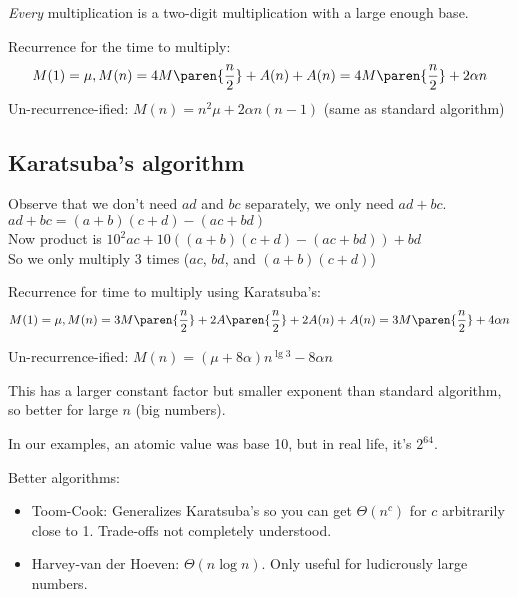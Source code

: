 \emph{Every} multiplication is a two-digit multiplication with a large enough base.

Recurrence for the time to multiply:
\[M(1) = \mu, M(n) = 4M\paren{\frac n 2} + A(n) + A(n) = 4M\paren{\frac n 2} + 2\alpha n\]
Un-recurrence-ified: $M(n) = n^2\mu + 2\alpha n(n-1)$ (same as standard algorithm)

\subsection{Karatsuba's algorithm}

Observe that we don't need $ad$ and $bc$ separately, we only need $ad + bc$. $ad + bc = (a + b)(c + d) - (ac + bd)$\\
Now product is $10^2ac + 10((a + b)(c + d) - (ac + bd)) + bd$\\
So we only multiply 3 times ($ac$, $bd$, and $(a + b)(c + d)$)

Recurrence for time to multiply using Karatsuba's:
\[M(1) = \mu, M(n) = 3M\paren{\frac n 2} + 2A\paren{\frac n 2} + 2A(n) + A(n) = 3M\paren{\frac n 2} + 4\alpha n\]

Un-recurrence-ified: $M(n) = (\mu + 8\alpha)n^{\lg 3} - 8\alpha n$

This has a larger constant factor but smaller exponent than standard algorithm, so better for large $n$ (big numbers).

In our examples, an atomic value was base 10, but in real life, it's $2^{64}$.

Better algorithms:
\begin{itemize}
    \item Toom-Cook: Generalizes Karatsuba's so you can get $\Theta(n^c)$ for $c$ arbitrarily close to 1. Trade-offs not completely understood.
    \item Harvey-van der Hoeven: $\Theta(n \log n)$. Only useful for ludicrously large numbers.
\end{itemize}
